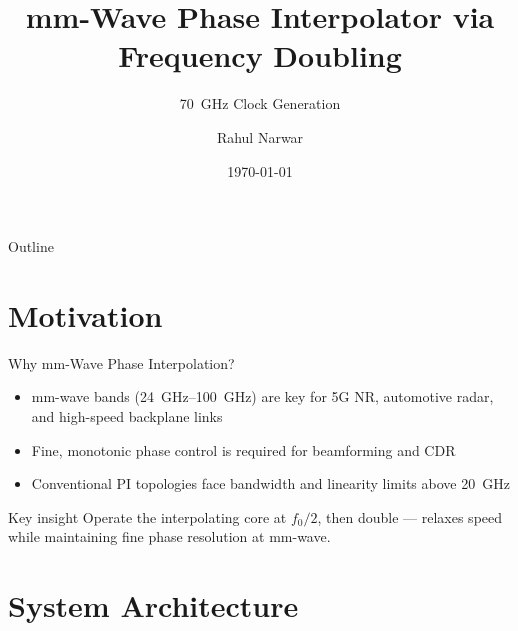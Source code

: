\documentclass[10pt, aspectratio=169]{beamer}
\title{mm-Wave Phase Interpolator via Frequency Doubling}
\subtitle{\texorpdfstring{\SI{70}{\giga\hertz}}{70 GHz} Clock Generation}
\author{Rahul Narwar}
\date{\today}
\institute{}
\begin{document}
\maketitle

\begin{frame}{Outline}
  \tableofcontents
\end{frame}

\section{Motivation}

\begin{frame}{Why mm-Wave Phase Interpolation?}
  \begin{itemize}
    \item mm-wave bands (\SIrange{24}{100}{\giga\hertz}) are key for 5G NR,
          automotive radar, and high-speed backplane links
    \item Fine, monotonic phase control is required for beamforming and CDR
    \item Conventional PI topologies face bandwidth and linearity limits above
          \SI{20}{\giga\hertz}
  \end{itemize}
  \begin{block}{Key insight}
    Operate the interpolating core at $f_0/2$, then double —
    relaxes speed while maintaining fine phase resolution at mm-wave.
  \end{block}
\end{frame}

\section{System Architecture}
\end{document}

